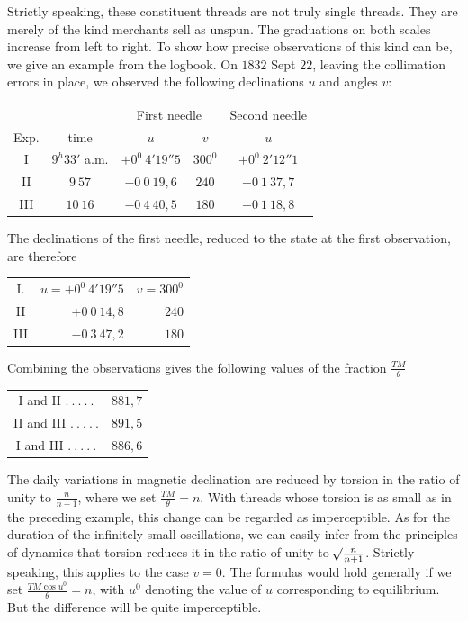\expandafter\def\csname HistoricalNoteText9\endcsname{Strictly speaking, these constituent threads are not truly single threads. They are merely of the kind merchants sell as unspun.}
\expandafter\def\csname HistoricalNoteText8\endcsname{The graduations on both scales increase from left to right.}
To show how precise observations of this kind can be, we give an example from the logbook. On $1832$ Sept $22$, leaving the collimation errors in place, we observed the following declinations $u$ and angles $v$:
\begin{center}
\begin{tabular}{c|c||c|c||c}
&&\multicolumn{2}{c||}{First needle}&Second needle\\
Exp.&time&$u$&$v$&$u$\\\hline
I&$9^h33'$ a.m.&$+0^0\ 4'19''5$&$300^0$&$+0^0\ 2'12''1$\\
II&$9\ 57$&$-0\ 0\ 19{,}6$&$240$&$+0\ 1\ 37{,}7$\\
III&$10\ 16$&$-0\ 4\ 40{,}5$&$180$&$+0\ 1\ 18{,}8$
\end{tabular}
\end{center}
The declinations of the first needle, reduced to the state at the first observation, are therefore
\begin{center}
\begin{tabular}{crr}
I.&$u=+0^0\ 4'19''5$&$v=300^0$\\
II&$+0\ 0\ 14{,}8$&$240$\\
III&$-0\ 3\ 47{,}2$&$180$
\end{tabular}
\end{center}
Combining the observations gives the following values of the fraction $\frac{TM}{\theta}$
\begin{center}
\begin{tabular}{cr}
I and II $.\ .\ .\ .\ .$&$881{,}7$\\
II and III $.\ .\ .\ .\ .$&$891{,}5$\\
I and III $.\ .\ .\ .\ .$&$886{,}6$
\end{tabular}
\end{center}

The daily variations in magnetic declination are reduced by torsion in the ratio of unity to $\frac{n}{n+1}$, where we set $\frac{TM}{\theta}=n$. With threads whose torsion is as small as in the preceding example, this change can be regarded as imperceptible. As for the duration of the infinitely small oscillations, we can easily infer from the principles of dynamics that torsion reduces it in the ratio of unity to $\mathord{{}^{}\!\surd}\frac{n}{n+1}$. Strictly speaking, this applies to the case $v=0$. The formulas would hold generally if we set $\frac{TM\cos u^0}{\theta}=n$, with $u^0$ denoting the value of $u$ corresponding to equilibrium. But the difference will be quite imperceptible.

